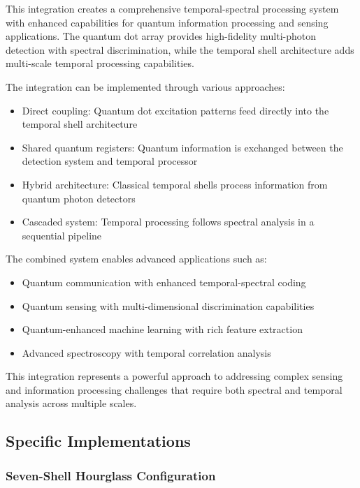 \documentclass[12pt,letterpaper]{article}
\begin{document}
This integration creates a comprehensive temporal-spectral processing system with enhanced capabilities for quantum information processing and sensing applications. The quantum dot array provides high-fidelity multi-photon detection with spectral discrimination, while the temporal shell architecture adds multi-scale temporal processing capabilities.

The integration can be implemented through various approaches:

\begin{itemize}
    \item Direct coupling: Quantum dot excitation patterns feed directly into the temporal shell architecture
    \item Shared quantum registers: Quantum information is exchanged between the detection system and temporal processor
    \item Hybrid architecture: Classical temporal shells process information from quantum photon detectors
    \item Cascaded system: Temporal processing follows spectral analysis in a sequential pipeline
\end{itemize}

The combined system enables advanced applications such as:

\begin{itemize}
    \item Quantum communication with enhanced temporal-spectral coding
    \item Quantum sensing with multi-dimensional discrimination capabilities
    \item Quantum-enhanced machine learning with rich feature extraction
    \item Advanced spectroscopy with temporal correlation analysis
\end{itemize}

This integration represents a powerful approach to addressing complex sensing and information processing challenges that require both spectral and temporal analysis across multiple scales.

\subsection{Specific Implementations}

\subsubsection{Seven-Shell Hourglass Configuration}
\end{document}
